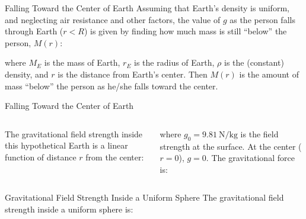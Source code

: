 \documentclass[12pt,compress,aspectratio=169]{beamer}
\begin{document}
\begin{frame}{Falling Toward the Center of Earth}
  Assuming that Earth's density is uniform, and neglecting air resistance and
  other factors, the value of $g$ as the person falls through Earth ($r<R$) is
  given by finding how much mass is still ``below'' the person, $M(r)$:


  where $M_E$ is the mass of Earth, $r_E$ is the radius of Earth, $\rho$ is the
  (constant) density, and $r$ is the distance from Earth's center. Then $M(r)$
  is the amount of mass ``below'' the person as he/she falls toward the center.
\end{frame}



\begin{frame}{Falling Toward the Center of Earth}
  \begin{columns}

    The gravitational field strength inside this hypothetical Earth is a
    linear function of distance $r$ from the center:

    
    where $g_0=\SI{9.81}{\newton\per\kilogram}$ is the field strength at the
    surface. At the center ($r=0$), $g=0$. The gravitational force is:
    
  \end{columns}
\end{frame}



\begin{frame}{Gravitational Field Strength Inside a Uniform Sphere}
  The gravitational field strength inside a uniform sphere is:
  \begin{center}
  \end{center}
\end{frame}
\end{document}
